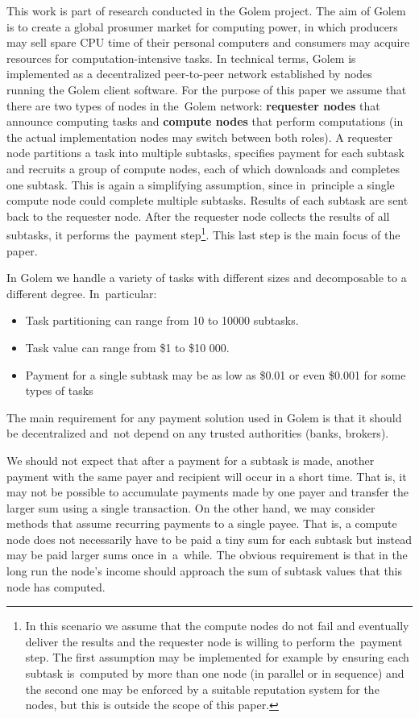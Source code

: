 \documentclass[a4paper]{article}
\begin{document}
    This work is part of research conducted in the Golem project. The aim of Golem is to create a global prosumer
    market for computing power, in which producers may sell spare CPU time of their personal computers and consumers
    may acquire resources for computation-intensive tasks. In technical terms, Golem is implemented as a decentralized
    peer-to-peer network established by nodes running the Golem client software. For the purpose of this paper
    we assume that there are two types of nodes in the~Golem network: \textbf{requester nodes} that announce computing
    tasks and \textbf{compute nodes} that perform computations (in the actual implementation nodes may switch between
    both roles).
    A requester node partitions a task into multiple subtasks, specifies payment for each subtask and recruits
    a group of compute nodes, each of which downloads and completes one subtask. This is again a simplifying
    assumption, since in~principle a single compute node could complete multiple subtasks.
    Results of each subtask are sent back to the requester node. After the requester node collects the results of all
    subtasks, it performs the~payment step\footnote{In this scenario we assume that the compute nodes do not fail
    and eventually deliver the results and the requester node is willing to perform the~payment step.
    The first assumption may be implemented for example by ensuring each subtask is~computed by more than one node
    (in parallel or in sequence) and the second one may be enforced by a suitable reputation system for the nodes,
    but this is outside the scope of this paper.}. This last step is the main focus of the paper.

    In Golem we handle a variety of tasks with different sizes and decomposable to a different degree. In~particular:
    \begin{itemize}
        \item Task partitioning can range from 10 to 10000 subtasks.
        \item Task value can range from \$1 to \$10 000.
        \item Payment for a single subtask may be as low as \$0.01 or even \$0.001 for some types of tasks
    \end{itemize}

    The main requirement for any payment solution used in Golem is that it should be decentralized and~not depend
    on any trusted authorities (banks, brokers).


    We should not expect that after a payment for a subtask is made, another payment with the same payer and recipient
    will occur in a short time. That is, it may not be possible to accumulate payments made by one payer and transfer
    the larger sum using a single transaction. On the other hand, we may consider methods that assume recurring
    payments to a single payee. That is, a compute node does not necessarily have to be paid a tiny sum for each
    subtask but instead may be paid larger sums once in~a~while. The obvious requirement is that in the long run
    the node's income should approach the sum of subtask values that this node has computed.
\end{document}
